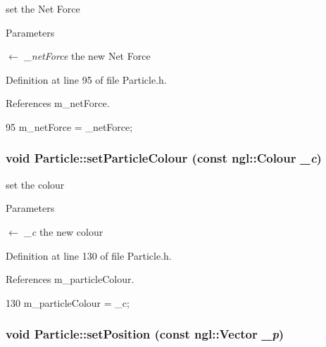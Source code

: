 set the Net Force 


\begin{DoxyParams}{Parameters}
\item[\mbox{$\leftarrow$} {\em \_\-netForce}]the new Net Force \end{DoxyParams}


Definition at line 95 of file Particle.h.



References m\_\-netForce.




\begin{DoxyCode}
95 { m_netForce = _netForce; }
\end{DoxyCode}


\hypertarget{class_particle_afa5226e879eb60ca5902a733c7c365fb}{
\subsubsection[{setParticleColour}]{\setlength{\rightskip}{0pt plus 5cm}void Particle::setParticleColour (const ngl::Colour {\em \_\-c})}}
\label{class_particle_afa5226e879eb60ca5902a733c7c365fb}


set the colour 


\begin{DoxyParams}{Parameters}
\item[\mbox{$\leftarrow$} {\em \_\-c}]the new colour \end{DoxyParams}


Definition at line 130 of file Particle.h.



References m\_\-particleColour.




\begin{DoxyCode}
130 { m_particleColour = _c; }
\end{DoxyCode}


\hypertarget{class_particle_a6e5693325b3f5b49458e66624576a0a7}{
\subsubsection[{setPosition}]{\setlength{\rightskip}{0pt plus 5cm}void Particle::setPosition (const ngl::Vector {\em \_\-p})}}
\label{class_particle_a6e5693325b3f5b49458e66624576a0a7}



